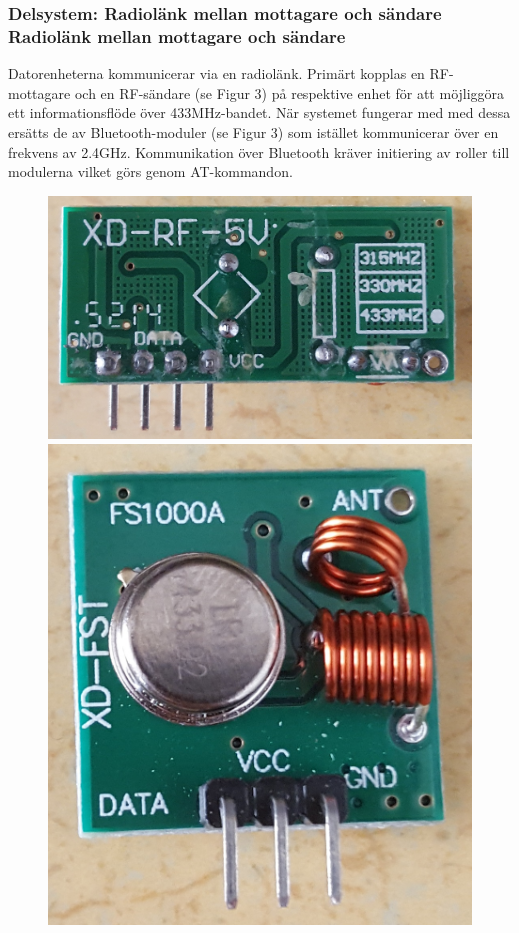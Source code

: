 \documentclass[a4paper]{article}
\begin{document}
\subsubsection{Delsystem: Radiolänk mellan mottagare och sändare \\ Radiolänk mellan mottagare och sändare}
Datorenheterna kommunicerar via en radiolänk. Primärt kopplas en RF-mottagare och en RF-sändare (se Figur 3) på respektive enhet för att möjliggöra ett informationsflöde över 433MHz-bandet. När systemet fungerar med med dessa ersätts de av Bluetooth-moduler (se Figur 3) som istället kommunicerar över en frekvens av 2.4GHz. Kommunikation över Bluetooth kräver initiering av roller till modulerna vilket görs genom AT-kommandon. 



\begin{figure}[H]
\centering
\includegraphics[scale=0.06]{RF-transmitter.jpg}
\includegraphics[scale=0.05]{RF-receiver.jpg} \\ \vspace{2mm}

\end{figure}
\end{document}
